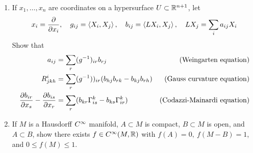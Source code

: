 \documentclass[../main]{subfiles}
\begin{document}
\begin{enumerate}
\item\label{pro:62} If $x_1,\ldots,x_n$ are coordinates on a hypersurface $U\subset\mathbb{R}^{n+1}$, let
\[x_i = \dfrac{\partial }{\partial x_i},
\quad g_{ij} = \left\langle X_i,X_j\right\rangle,
\quad b_{ij} = \left\langle LX_i,X_j\right\rangle,
\quad LX_j=\sum_i a_{ij}X_i\]
Show that
\begin{align*}
a_{ij} &= \sum_r(g\inv)_{ir}b_{rj} & \text{(Weingarten equation)}\index{Weingarten map}\\
R_{jkh}^i &= \sum_r(g\inv))_{ir}(b_{hj}b_{rk}-b_{kj}b_{rh}) & \text{(Gauss curvature equation)}\\
\pdv{b_{ir}}{x_s} - \pdv{b_{is}}{x_r} &= \sum_r(b_{kr}\Gamma_{is}^k - b_{ks}\Gamma_{ir}^k) & \text{(Codazzi-Mainardi equation)}
\end{align*}

\item\label{pro:63} If $M$ is a Hausdorff $C^\infty$ manifold, $A\subset M$ is compact, $B\subset M$ is open, and $A\subset B$, show there exists $f\in C^\infty(M,\mathbb{R})$ with $f(A)=0,~f(M-B)=1$, and $0\le f(M)\le 1$.

\end{enumerate}
\end{document}
